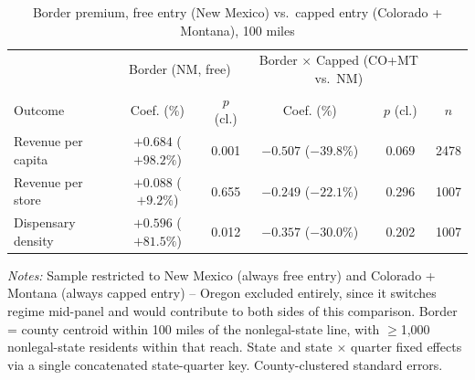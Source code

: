\begin{table}[htbp]
\centering
\caption{Border premium, free entry (New Mexico) vs.\ capped entry (Colorado + Montana), 100 miles}
\label{tab:county_border_capped_nmcomt_100mi}
\footnotesize
\begin{tabular}{lccccc}
\toprule
& \multicolumn{2}{c}{Border (NM, free)} & \multicolumn{2}{c}{Border $\times$ Capped (CO+MT vs.\ NM)} & \\
Outcome & Coef. (\%) & $p$ (cl.) & Coef. (\%) & $p$ (cl.) & $n$ \\
\midrule
Revenue per capita & $+0.684$ ($+98.2\%$) & 0.001 & $-0.507$ ($-39.8\%$) & 0.069 & 2478 \\
Revenue per store & $+0.088$ ($+9.2\%$) & 0.655 & $-0.249$ ($-22.1\%$) & 0.296 & 1007 \\
Dispensary density & $+0.596$ ($+81.5\%$) & 0.012 & $-0.357$ ($-30.0\%$) & 0.202 & 1007 \\
\bottomrule
\end{tabular}
\begin{minipage}{0.98\textwidth}
\vspace{0.3em}
\footnotesize
\textit{Notes:} Sample restricted to New Mexico (always free entry) and Colorado + Montana (always capped
entry) -- Oregon excluded entirely, since it switches regime mid-panel and would contribute to both sides of
this comparison. Border = county centroid within 100 miles of the nonlegal-state line, with
$\geq$1,000 nonlegal-state residents within that reach. State and state $\times$ quarter fixed effects via a
single concatenated state-quarter key. County-clustered standard errors.
\end{minipage}
\end{table}
